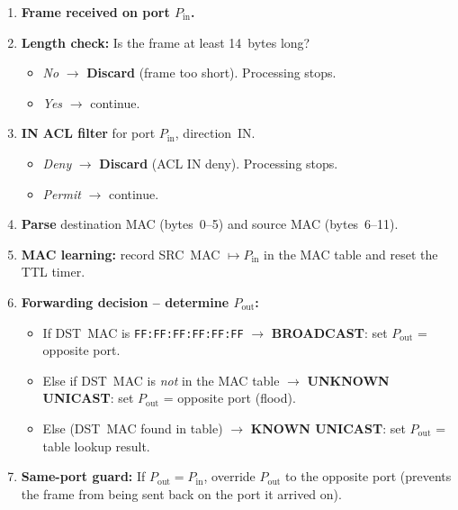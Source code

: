 \documentclass[12pt,a4paper]{article}
\begin{document}
\begin{enumerate}
  \item \textbf{Frame received on port $P_{\mathrm{in}}$.}

  \item \textbf{Length check:} Is the frame at least 14~bytes long?
    \begin{itemize}[noitemsep]
      \item \emph{No} $\to$ \textbf{Discard} (frame too short). Processing
            stops.
      \item \emph{Yes} $\to$ continue.
    \end{itemize}

  \item \textbf{IN ACL filter} for port $P_{\mathrm{in}}$, direction~IN.
    \begin{itemize}[noitemsep]
      \item \emph{Deny} $\to$ \textbf{Discard} (ACL IN deny). Processing
            stops.
      \item \emph{Permit} $\to$ continue.
    \end{itemize}

  \item \textbf{Parse} destination MAC (bytes~0--5) and source MAC
        (bytes~6--11).

  \item \textbf{MAC learning:} record SRC~MAC $\mapsto P_{\mathrm{in}}$ in the
        MAC table and reset the TTL timer.

  \item \textbf{Forwarding decision -- determine $P_{\mathrm{out}}$:}
    \begin{itemize}[noitemsep]
      \item If DST~MAC is \texttt{FF:FF:FF:FF:FF:FF} $\to$
            \textbf{BROADCAST}: set $P_{\mathrm{out}}$ = opposite port.
      \item Else if DST~MAC is \emph{not} in the MAC table $\to$
            \textbf{UNKNOWN UNICAST}: set $P_{\mathrm{out}}$ = opposite port
            (flood).
      \item Else (DST~MAC found in table) $\to$
            \textbf{KNOWN UNICAST}: set $P_{\mathrm{out}}$ = table lookup
            result.
    \end{itemize}

  \item \textbf{Same-port guard:} If $P_{\mathrm{out}} = P_{\mathrm{in}}$,
        override $P_{\mathrm{out}}$ to the opposite port (prevents the
        frame from being sent back on the port it arrived on).


\end{enumerate}
\end{document}
